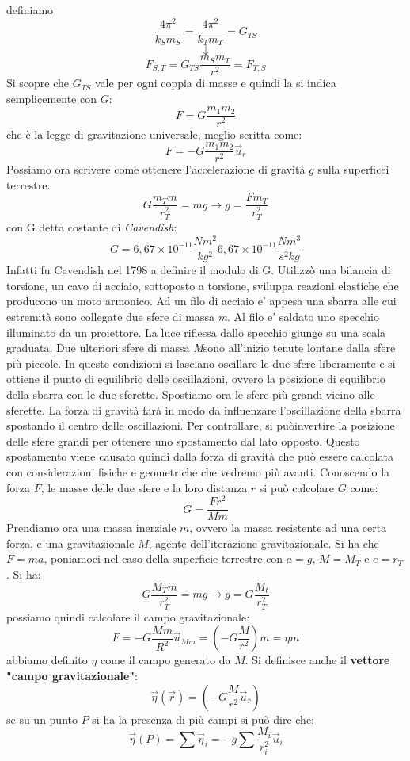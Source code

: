 \documentclass[a4paper,12pt, oneside]{book}
\begin{document}
definiamo
$$\frac{4\pi^2}{k_Sm_S}=\frac{4\pi^2}{k_Tm_T}=G_{TS }$$
$$\downarrow$$
$$F_{S,T}=G_{TS}\frac{m_Sm_T}{r^2}	=F_{T,S}$$
Si scopre che $G_{TS}$ vale per ogni coppia di masse e quindi la si indica semplicemente con $G$:
$$F=G\frac{m_1m_2}{r^2}$$
che è la legge di gravitazione universale, meglio scritta come:
$$F=-G\frac{m_1m_2}{r^2}\vec{u}_r$$
Possiamo ora scrivere come ottenere l'accelerazione di gravità $g$ sulla superficei terrestre:
$$G\frac{m_Tm}{r_T^2}=mg\to g=\frac{Fm_T}{r_T^2}$$
con G detta costante di \textit{Cavendish}:
$$G=6,67\times10^{-11}\frac{Nm^2}{kg^2}6,67\times10^{-11}\frac{Nm^3}{s^2kg}$$
Infatti fu Cavendish nel 1798 a definire il modulo di G. Utilizzò una bilancia di torsione, un cavo di acciaio, sottoposto a torsione, sviluppa reazioni elastiche che producono un moto armonico. Ad un filo di acciaio e' appesa una sbarra alle cui estremità sono collegate due sfere di massa \textit{m}. Al filo e' saldato uno specchio illuminato da un proiettore. La luce riflessa dallo specchio giunge su una scala graduata. Due ulteriori sfere di massa \textit{M}sono all'inizio tenute lontane dalla sfere più piccole. In queste condizioni si lasciano oscillare le due sfere liberamente e si ottiene il punto di equilibrio delle oscillazioni, ovvero la posizione di equilibrio della sbarra con le due sferette. Spostiamo ora le sfere più grandi vicino alle sferette. La forza di gravità farà in modo da influenzare l'oscillazione della sbarra spostando il centro delle oscillazioni. Per controllare, si puòinvertire la posizione delle sfere grandi per ottenere uno spostamento dal lato opposto. Questo spostamento viene causato quindi dalla forza di gravità che può essere calcolata con considerazioni fisiche e geometriche che vedremo più avanti. Conoscendo la forza $F$, le masse delle due sfere e la loro distanza $r$ si può calcolare $G$ come:
$$G=\frac{Fr^2}{Mm}$$
Prendiamo ora una massa inerziale $m$, ovvero la massa resistente ad una certa forza, e una gravitazionale $M$, agente dell'iterazione gravitazionale. Si ha che $F=ma$, poniamoci nel caso della superficie terrestre con $a=g$, $M=M_T$ e $e=r_T$. Si ha:
$$G\frac{M_Tm}{r_T^2}=mg\to g=G\frac{M_t}{r_T^2}$$
possiamo quindi calcolare il campo gravitazionale:
$$F=-G\frac{Mm}{R^2}\vec{u}_{Mm}=\left(-G\frac{M}{r^2}\right)m=\eta m$$
abbiamo definito $\eta$ come il campo generato da $M$. Si definisce anche il \textbf{vettore "campo gravitazionale"}:
$$\vec{\eta}(\vec{r})=\left(-G\frac{M}{r^2}\vec{u}_r\right)$$
se su un punto $P$ si ha la presenza di più campi si può dire che:
$$\vec{\eta}(P)=\sum \vec{\eta}_i=-g\sum \frac{M_i}{r_i^2}\vec{u}_i$$
\end{document}
